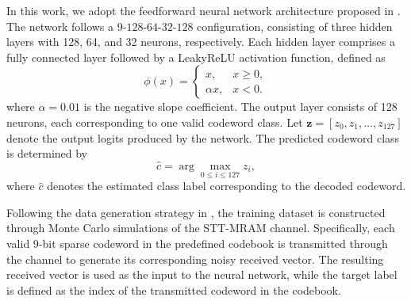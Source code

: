 \documentclass[conference]{IEEEtran}
\begin{document}
In this work, we adopt the feedforward neural network architecture proposed in \cite{gruber2017deep}. The network follows a $9$-$128$-$64$-$32$-$128$ configuration, consisting of three hidden layers with 128, 64, and 32 neurons, respectively. Each hidden layer comprises a fully connected layer followed by a LeakyReLU activation function, defined as
\begin{equation}
\phi(x)=
\left\{
\begin{array}{ll}
x, & x \ge 0,\\
\alpha x, & x < 0.
\end{array}
\right.
\label{eq:leakyrelu}
\end{equation}
where $\alpha=0.01$ is the negative slope coefficient. The output layer consists of 128 neurons, each corresponding to one valid codeword class. Let $\mathbf{z}=[z_0,z_1,\ldots,z_{127}]$ denote the output logits produced by the network. The predicted codeword class is determined by
\begin{equation}
\hat{c}=\arg\max_{0\leq i\leq127} z_i,
\label{eq:argmax}
\end{equation}
where $\hat{c}$ denotes the estimated class label corresponding to the decoded codeword.


Following the data generation strategy in \cite{bennatan2018deep}, the training dataset is constructed through Monte Carlo simulations of the STT-MRAM channel. Specifically, each valid 9-bit sparse codeword in the predefined codebook is transmitted through the channel to generate its corresponding noisy received vector. The resulting received vector is used as the input to the neural network, while the target label is defined as the index of the transmitted codeword in the codebook.


\end{document}
